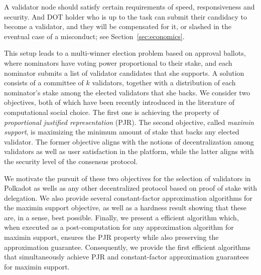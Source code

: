 A validator node should satisfy certain requirements of speed, responsiveness and security. And DOT holder who is up to the task can submit their candidacy to become a validator, and they will be compensated for it, or slashed in the eventual case of a misconduct; see Section~\ref{sec:economics}.

This setup leads to a multi-winner election problem based on approval ballots, where nominators have voting power proportional to their stake, and each nominator submits a list of validator candidates that she supports. A solution consists of a committee of $k$ validators, together with a distribution of each nominator's stake among the elected validators that she backs. We consider two objectives, both of which have been recently introduced in the literature of computational social choice. The first one is achieving the property of \emph{proportional justified representation} (PJR). The second objective, called \emph{maximin support}, is maximizing the minimum amount of stake that backs any elected validator. The former objective aligns with the notions of decentralization among validators as well as user satisfaction in the platform, while the latter aligns with the security level of the consensus protocol.


We motivate the pursuit of these two objectives for the selection of validators in Polkadot as wells as any other decentralized protocol based on proof of stake with delegation. We also provide several constant-factor approximation algorithms for the maximin support objective, as well as a hardness result showing that these are, in a sense, best possible. Finally, we present a efficient algorithm which, when executed as a post-computation for any approximation algorithm for maximin support, ensures the PJR property while also preserving the approximation guarantee. Consequently, we provide the first efficient algorithms that simultaneously achieve PJR and constant-factor approximation guarantees for maximin support.
